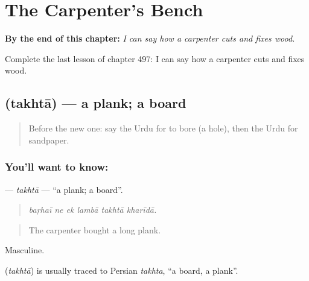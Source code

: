 
\chapter{The Carpenter's Bench}
\label{ch:ur-the-carpenter-s-bench}

\begin{chapteropening}
\textbf{By the end of this chapter:} \emph{I can say how a carpenter cuts and fixes wood.}

Complete the last lesson of chapter 497: I can say how a carpenter cuts and fixes wood.
\end{chapteropening}

\section[\texorpdfstring{\ur{تختہ} (takhtā)}{تختہ (takhtā)}]{ (takhtā) — a plank; a board}

\label{lesson:UR-C497-takhta}



\begin{quote}
Before the new one: say the Urdu for to bore (a hole), then the Urdu for sandpaper.
\end{quote}

\subsection*{You'll want to know: }
\textbf{} — \emph{takhtā} — \textquotedblleft{}a plank; a board\textquotedblright{}.

\begin{quote}
     
\end{quote}

\begin{quote}
\emph{baṛhaī ne ek lambā takhtā kharīdā.}
\end{quote}

\begin{quote}
The carpenter bought a long plank.
\end{quote}

Masculine.

\begin{cousinweb}
\textbf{} (\emph{takhtā}) is usually traced to Persian \emph{takhta}, \textquotedblleft{}a board, a plank\textquotedblright{}.
\end{cousinweb}

